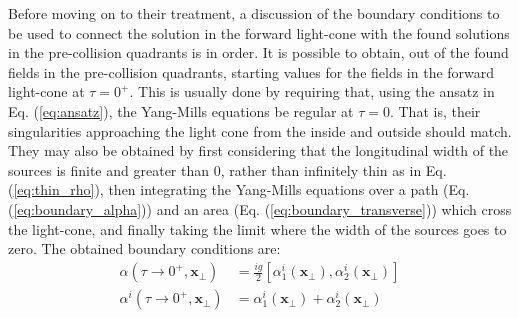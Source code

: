 Before moving on to their treatment, a discussion of the boundary conditions to be used to connect the solution in the forward light-cone with the found solutions in the pre-collision quadrants is in order. It is possible to obtain, out of the found fields in the pre-collision quadrants, starting values for the fields in the forward light-cone at $\tau = 0^+$. This is usually done by requiring that, using the ansatz in Eq. (\ref{eq:ansatz}), the Yang-Mills equations be regular at $\tau = 0$. That is, their singularities approaching the light cone from the inside and outside should match. \cite{Guerrero_Rodr_guez_2021} They may also be obtained by first considering that the longitudinal width of the sources is finite and greater than $0$, rather than infinitely thin as in Eq. (\ref{eq:thin_rho}), then integrating the Yang-Mills equations over a path (Eq. (\ref{eq:boundary_alpha})) and an area (Eq. (\ref{eq:boundary_transverse})) which cross the light-cone, and finally taking the limit where the width of the sources goes to zero. \cite[Appendix C]{Carrington_2022_Energy_Momentum_Tensor} The obtained boundary conditions are:
\begin{subequations}
\label{eq:boundary_conditions}
\begin{align}
	\alpha(\tau \to 0^+, \mathbf{x}_\perp) & = \frac{ig}{2} \left[ \alpha_1^i(\mathbf{x}_\perp), \alpha_2^i(\mathbf{x}_\perp) \right]
	\label{eq:boundary_alpha} \\
	\alpha^i(\tau \to 0^+, \mathbf{x}_\perp) & =  \alpha_1^i(\mathbf{x}_\perp) + \alpha_2^i(\mathbf{x}_\perp)
	\label{eq:boundary_transverse}
\end{align}
\end{subequations}


